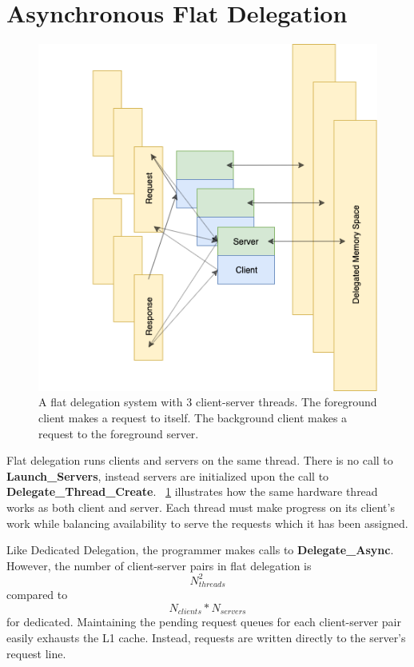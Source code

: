 \documentclass{uicthesi}
\begin{document}
\section{Asynchronous Flat Delegation}
\begin{figure}[ht!]
\centering
\includegraphics[width=0.9\columnwidth]{FIG/flat_async.png}
\caption{A flat delegation system with 3 client-server threads. The foreground client makes a request to itself. The background client makes a request to the foreground server. }
\label{fig:flat_delegation}
\end{figure}

Flat delegation runs clients and servers on the same thread. There is no call to \textbf{Launch\_Servers}, instead servers are initialized upon the call to \textbf{Delegate\_Thread\_Create}. ~\ref{fig:flat_delegation} illustrates how the same hardware thread works as both client and server. Each thread must make progress on its client's work while balancing availability to serve the requests which it has been assigned. 

Like Dedicated Delegation, the programmer makes calls to \textbf{Delegate\_Async}. However, the number of client-server pairs in flat delegation is 
\begin{displaymath}
N_{threads}^2 
\end{displaymath}
compared to 
\begin{displaymath}
N_{clients} * N_{servers}
\end{displaymath} 
for dedicated. Maintaining the pending request queues for each client-server pair easily exhausts the L1 cache. Instead, requests are written directly to the server's request line. 
\end{document}
